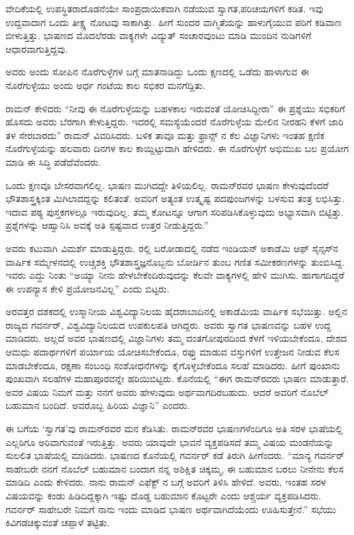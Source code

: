 ವೇದಿಕೆಯಲ್ಲಿ ಉಪಸ್ಥಿತರಾದೊಡನೆಯೇ ಸಾಂಪ್ರದಾಯಿಕವಾಗಿ ನಡೆಯುವ ಸ್ವಾಗತ,\break ಪರಿಚಯಗಳಿಗೆ ಕಡಿತ. ಇವು ಉದ್ದವಾದಾಗ ಒಂದು ತೀಕ್ಷ್ಣ ನೋಟವು ಸಾಕಾಗಿತ್ತು. ಹೀಗೆ ಸುಂದರ ವಾಗ್ಮಿತೆಯನ್ನು ಹಾಳುಗೈಯುವ ಪರಿಗೆ ಕಡಿವಾಣ ಬೀಳುತ್ತಿತ್ತು. ಭಾಷಣದ ಮೊದಲೆರಡು ವಾಕ್ಯಗಳೇ ವಿದ್ಯುತ್ ಸಂಚಾರವುಂಟು ಮಾಡಿ ಮುಂದಿನ ನುಡಿಗಳಿಗೆ ಆಧಾರವಾಗುತ್ತಿದ್ದವು.

ಅವರು ಅಂದು ಸೋಪಿನ ನೊರೆಗುಳ್ಳೆಗಳ ಬಗ್ಗೆ ಮಾತನಾಡಿದ್ದು ಒಂದು ಕ್ಷಣದಲ್ಲಿ ಒಡೆದು ಹಾಳಾಗುವ ಈ ನೊರೆಗುಳ್ಳೆಯು ಅಂದು ಅರ್ಧ ಗಂಟೆಯ ಕಾಲ ಸಭಿಕರ ಮನಗೆದ್ದಿತು.

ರಾಮನ್ ಕೇಳಿದರು  “ನೀವು ಈ ನೊರೆಗುಳ್ಳೆಯನ್ನು ಬಹಳಕಾಲ ಇರುವಂತೆ ಯೋಚಿಸಿದ್ದೀರಾ” ಈ ಪ್ರಶ್ನೆಯು ಸಭಿಕರಿಗೆ ಹೊಸದು ಅವರು ಬೆರಗಾಗಿ ಕೇಳುತ್ತಿದ್ದರು. ಇದರಲ್ಲಿ ಸಮಸ್ಯೆಯೆಂದರೆ ನೊರೆಗುಳ್ಳೆಯ ಮೇಲಿನ ನೀರಹನಿ ಕೆಳಗೆ ಜಾರಿ ತಳ ಸೇರಬಾರದು” ರಾಮನ್ ವಿವರಿಸಿದರು. ಬಳಿಕ ತಾವೂ ಮತ್ತು ಫ್ರಾನ್ಸ್ ನ ಕೆಲ ವಿಜ್ಞಾನಿಗಳು ಇಂತಹ ಕ್ಷಣಿಕ ನೊರೆಗುಳ್ಳೆಯನ್ನು ಹಲವಾರು ದಿನಗಳ ಕಾಲ ಕಾಯ್ದಿಟ್ಟುದಾಗಿ ಹೇಳಿದರು. ಈ ನೊರೆಗುಳ್ಳೆಗೆ ಅಭಿಮುಖ ಬಲ ಪ್ರಯೋಗ ಮಾಡಿ ಈ ಸಿದ್ಧಿ ಪಡೆದೆವೆಂದರು.

ಒಂದು ಕ್ಷಣವೂ ಬೇಸರವಾಗಲಿಲ್ಲ. ಭಾಷಣ ಮುಗಿದದ್ದೇ ತಿಳಿಯಲಿಲ್ಲ. ರಾಮನ್‍ರವರ ಭಾಷಣ ಕೇಳುವುದೆಂದರೆ ಭೌತಶಾಸ್ತ್ರಕ್ಕಿಂತ ಮಿಗಿಲಾದದ್ದನ್ನು ಕಲಿತಂತೆ. ಅವರಿಗೆ ಅತ್ಯಂತ ಉತ್ಕೃಷ್ಟ ಪದಪುಂಜಗಳನ್ನು ಬಳಸುವ ತಂತ್ರ ಲಭಿಸಿತ್ತು. ಇದಾವ ಪಠ್ಯ ಪುಸ್ತಕಗಳಲ್ಲೂ ಇರುವುದಿಲ್ಲ. ತಮ್ಮ ಕೋಟನ್ನೂ ಆಗಾಗ ಸರಿಪಡಿಸಿಕೊಳ್ಳುವುದು ಅಭ್ಯಾಸವಾಗಿ ಬಿಟ್ಟಿತ್ತು. ಪ್ರಶ್ನೆಗಳನ್ನು ಆಹ್ವಾನಿಸಿ ಅವಕ್ಕೆ ಅತಿ ಸ್ಪಷ್ಟವಾದ ಉತ್ತರ ನೀಡುತ್ತಿದ್ದರು.”

ಅವರು ಕಟುವಾಗಿ ವಿಮರ್ಶೆ ಮಾಡುತ್ತಿದ್ದರು. ರಲ್ಲಿ ಬರೋಡಾದಲ್ಲಿ ನಡೆದ ಇಂಡಿಯನ್ ಅಕಾಡೆಮಿ ಆಫ್ ಸೈನ್ಸಸ್‍ನ ವಾರ್ಷಿಕ ಸಮ್ಮೇಳನದಲ್ಲಿ ಉಚ್ಚಶಕ್ತಿ ಭೌತಶಾಸ್ತ್ರಜ್ಞನೊಬ್ಬನು ಬೋರ್ಡಿನ ತುಂಬ ಗಣಿತ ಸಮೀಕರಣಗಳನ್ನು ತುಂಬಿಸಿದ್ದ. ಇವರು ಎದ್ದು ನಿಂತು “ಅಯ್ಯಾ ನೀನು ಹೇಳಬೇಕೆಂದಿರುವುದನ್ನು ಕೆಲವೇ ವಾಕ್ಯಗಳಲ್ಲಿ ಹೇಳಿ ಮುಗಿಸು. ಹಾಗಾಗದಿದ್ದರೆ ಈ ಉಪನ್ಯಾಸ ಕೇಳಿ ಪ್ರಯೋಜನವಿಲ್ಲ” ಎಂದು ಬಿಟ್ಟರು.

\newpage

ಅರವತ್ತರ ದಶಕದಲ್ಲಿ ಉಸ್ಮಾನೀಯ ವಿಶ್ವವಿದ್ಯಾನಿಲಯ ಹೈದರಾಬಾದಿನಲ್ಲಿ ಅಕಾಡೆಮಿಯ ವಾರ್ಷಿಕ ಸಭೆಯಿತ್ತು. ಅಲ್ಲಿನ ರಾಜ್ಯದ ಗವರ್ನರ್, ವಿಶ್ವವಿದ್ಯಾನಿಲಯದ ಉಪಕುಲಪತಿ ಆಗಿದ್ದರು. ಅವರು ಸ್ವಾಗತ ಭಾಷಣವನ್ನು ಬಹಳ ಉದ್ದ ಮಾಡಿದರು. ಅಲ್ಲದೆ ಅವರ ಭಾಷಣದಲ್ಲಿ ವಿಜ್ಞಾನಿಗಳು ತಮ್ಮ ದಂತಗೋಪುರದಿಂದ ಕೆಳಗೆ ಇಳಿಯಬೇಕೆಂದೂ, ದೇಶದ ಆಮಧು ಪದಾರ್ಥಗಳಿಗೆ ಪರ್ಯಾಯ ಯೋಚಿಸಬೇಕೆಂದೂ, ರಫ್ತು ಮಾಡುವ ವಸ್ತುಗಳಿಗೆ ಉತ್ತೇಜನ ನೀಡುವ ಕೆಲಸ ಮಾಡಬೇಕೆಂದೂ, ರಕ್ಷಣಾ ಸಂಬಂಧಿ ಸಂಶೋಧನೆಗಳನ್ನು ಕೈಗೊಳ್ಳಬೇಕೆಂದೂ ಸಲಹೆ ಮಾಡಿದರು. ಹೀಗೆ ಪುಂಖಾನು ಪುಂಖವಾಗಿ ಸಲಹೆಗಳ ಮಹಾಪೂರವನ್ನೇ ಹರಿಯಿಬಿಟ್ಟರು. ಕೊನೆಯಲ್ಲಿ “ಈಗ ರಾಮನ್‍ರವರು ಭಾಷಣ ಮಾಡುತ್ತಾರೆ. ಅವರ ವಿಷಯ \textit{} ನಿಮಗೆ ಮತ್ತು ನನಗೆ ಅವರು ಹೇಳುವುದು ಅರ್ಥವಾಗದಿರಬಹುದು. ಆದರೆ ಅವರಿಗೆ ನೊಬೆಲ್ ಬಹುಮಾನ ಬಂದಿದೆ. ಅವರೊಬ್ಬ ಹಿರಿಯ ವಿಜ್ಞಾನಿ” ಎಂದರು.

ಈ ಬಗೆಯ ‘ಸ್ವಾಗತ’ವು ರಾಮನ್‍ರವರ ಮನ ಕೆಡಿಸಿತು. ರಾಮನ್‍ರವರ ಭಾಷಣಗಳೆಂದಿಗೂ ಅತಿ ಸರಳ ಭಾಷೆಯಲ್ಲಿ ಎಲ್ಲರಿಗೂ ಅರಿವಾಗುವಂತೆ ಇರುತ್ತಿತ್ತು. ಅವರು ಯಾವುದೇ ಭಾವನೆ ವ್ಯಕ್ತಪಡಿಸದೆ ತಮ್ಮ ವಿಷಯ ಮಂಡನೆಯನ್ನು ಸುಲಲಿತ ಭಾಷೆಯಲ್ಲಿ ಮಾಡಿದರು. ಭಾಷಣದ ಕೊನೆಯಲ್ಲಿ ಗವರ್ನರ್ ಕಡೆ ತಿರುಗಿ ಹೀಗೆಂದರು. “ಮಾನ್ಯ ಗವರ್ನರ್ ಸಾಹೇಬರೇ ನನಗೆ ನೊಬೆಲ್ ಬಹುಮಾನ ಬಂದಾಗ ನನ್ನ ಅಶಿಕ್ಷಿತ ಚಿಕ್ಕಮ್ಮ, ಈ ಬಹುಮಾನ ಬರಲು ನೀನೇನು ಕೆಲಸ ಮಾಡಿದಿ ಎಂದು ಕೇಳಿದರು. ನಾನು ರಾಮನ್ ಎಫೆಕ್ಟ್ ನ ಬಗ್ಗೆ ಅವರಿಗೆ ತಿಳಿಸಿ ಹೇಳಿದೆ. ಅವರು, ಇಂತಹ ಸರಳ ವಿಷಯವನ್ನು ಕಂಡು ಹಿಡಿದಿದ್ದಕ್ಕಾಗಿ ಇಷ್ಟು ದೊಡ್ಡ ಬಹುಮಾನ ಕೊಟ್ಟರೇ ಎಂದು ಆಶ್ಚರ್ಯ ವ್ಯಕ್ತಪಡಿಸಿದರು. ಗವರ್ನರ್ ಸಾಹೇಬರೇ ನಿಮಗೆ ನಾನು ಇಂದು ಮಾಡಿದ ಭಾಷಣ ಅರ್ಥವಾಗಿದೆಯೆಂದು ಊಹಿಸುತ್ತೇನೆ.” ಸಭೆಯು ಕಿವಿಗಡಚಿಕ್ಕುವಂತೆ ಚಪ್ಪಾಳೆ ತಟ್ಟಿತು.

